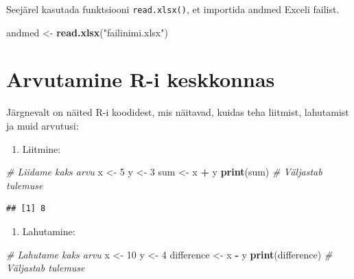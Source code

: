 \documentclass[
]{book}
\newenvironment{Shaded}{\begin{snugshade}}{\end{snugshade}}
\newcommand{\CommentTok}[1]{\textcolor[rgb]{0.56,0.35,0.01}{\textit{#1}}}
\newcommand{\DecValTok}[1]{\textcolor[rgb]{0.00,0.00,0.81}{#1}}
\newcommand{\FunctionTok}[1]{\textcolor[rgb]{0.13,0.29,0.53}{\textbf{#1}}}
\newcommand{\NormalTok}[1]{#1}
\newcommand{\OtherTok}[1]{\textcolor[rgb]{0.56,0.35,0.01}{#1}}
\newcommand{\SpecialCharTok}[1]{\textcolor[rgb]{0.81,0.36,0.00}{\textbf{#1}}}
\newcommand{\StringTok}[1]{\textcolor[rgb]{0.31,0.60,0.02}{#1}}
\providecommand{\tightlist}{%
  \setlength{\itemsep}{0pt}\setlength{\parskip}{0pt}}
\renewenvironment{Shaded} {\begin{snugshade}\footnotesize} {\end{snugshade}}
\begin{document}
Seejärel kasutada funktsiooni \texttt{read.xlsx()}, et importida andmed Exceli failist.

\begin{Shaded}
\begin{Highlighting}[]
\NormalTok{andmed }\OtherTok{\textless{}{-}} \FunctionTok{read.xlsx}\NormalTok{(}\StringTok{"failinimi.xlsx"}\NormalTok{)}
\end{Highlighting}
\end{Shaded}

\section{Arvutamine R-i keskkonnas}\label{arvutamine-r-i-keskkonnas}

Järgnevalt on näited R-i koodidest, mis näitavad, kuidas teha liitmist, lahutamist ja muid arvutusi:

\begin{enumerate}
\def\labelenumi{\arabic{enumi}.}
\tightlist
\item
  Liitmine:
\end{enumerate}

\begin{Shaded}
\begin{Highlighting}[]
\CommentTok{\# Liidame kaks arvu}
\NormalTok{x }\OtherTok{\textless{}{-}} \DecValTok{5}
\NormalTok{y }\OtherTok{\textless{}{-}} \DecValTok{3}
\NormalTok{sum }\OtherTok{\textless{}{-}}\NormalTok{ x }\SpecialCharTok{+}\NormalTok{ y}
\FunctionTok{print}\NormalTok{(sum) }\CommentTok{\# Väljastab tulemuse}
\end{Highlighting}
\end{Shaded}

\begin{verbatim}
## [1] 8
\end{verbatim}

\begin{enumerate}
\def\labelenumi{\arabic{enumi}.}
\setcounter{enumi}{1}
\tightlist
\item
  Lahutamine:
\end{enumerate}

\begin{Shaded}
\begin{Highlighting}[]
\CommentTok{\# Lahutame kaks arvu}
\NormalTok{x }\OtherTok{\textless{}{-}} \DecValTok{10}
\NormalTok{y }\OtherTok{\textless{}{-}} \DecValTok{4}
\NormalTok{difference }\OtherTok{\textless{}{-}}\NormalTok{ x }\SpecialCharTok{{-}}\NormalTok{ y}
\FunctionTok{print}\NormalTok{(difference) }\CommentTok{\# Väljastab tulemuse}
\end{Highlighting}
\end{Shaded}
\end{document}
